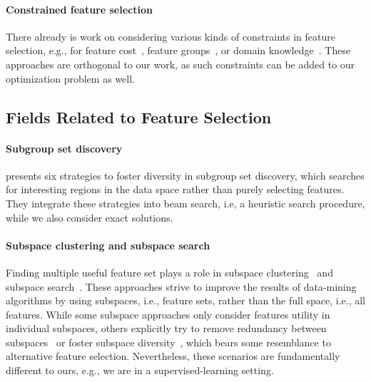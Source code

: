 \documentclass{article}
\theoremstyle{definition}
\begin{document}
\paragraph{Constrained feature selection}

There already is work on considering various kinds of constraints in feature selection, e.g., for feature cost~\cite{paclik2002feature}, feature groups~\cite{yuan2006model}, or domain knowledge~\cite{bach2022empirical, groves2015toward}.
These approaches are orthogonal to our work, as such constraints can be added to our optimization problem as well.

\subsection{Fields Related to Feature Selection}

\paragraph{Subgroup set discovery}

\cite{leeuwen2012diverse} presents six strategies to foster diversity in subgroup set discovery, which searches for interesting regions in the data space rather than purely selecting features.
They integrate these strategies into beam search, i.e, a heuristic search procedure, while we also consider exact solutions.

\paragraph{Subspace clustering and subspace search}

Finding multiple useful feature set plays a role in subspace clustering~\cite{guan2011unified, hu2018subspace, mueller2009relevant} and subspace search~\cite{fouche2021efficient, nguyen20134s, trittenbach2019dimension}.
These approaches strive to improve the results of data-mining algorithms by using subspaces, i.e., feature sets, rather than the full space, i.e., all features.
While some subspace approaches only consider features utility in individual subspaces, others explicitly try to remove redundancy between subspaces~\cite{mueller2009relevant, nguyen20134s} or foster subspace diversity~\cite{fouche2021efficient, trittenbach2019dimension}, which bears some resemblance to alternative feature selection.
Nevertheless, these scenarios are fundamentally different to ours, e.g., we are in a supervised-learning setting.
\end{document}
